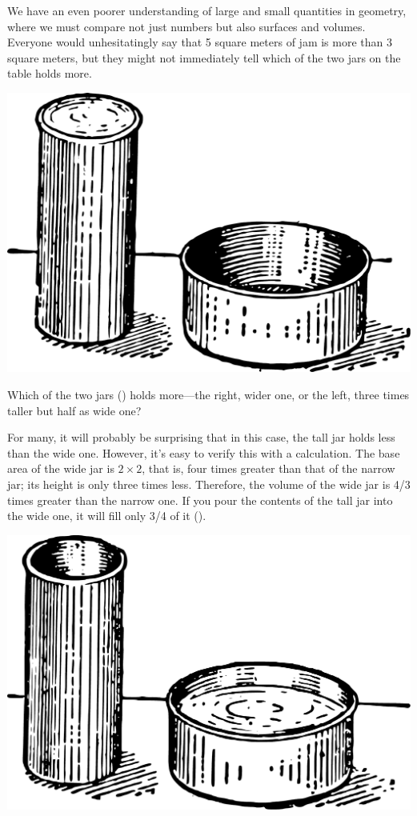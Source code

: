We have an even poorer understanding of large and small quantities in geometry, where we must compare not just numbers but also surfaces and volumes. Everyone would unhesitatingly say that 5 square meters of jam is more than 3 square meters, but they might not immediately tell which of the two jars on the table holds more.
\begin{marginfigure}[-2cm]%
\centering
\includegraphics[width=\textwidth]{figures/ch-11/fig-165.pdf}
\end{marginfigure}

\ques Which of the two jars () holds more—the right, wider one, or the left, three times taller but half as wide one?

\ans For many, it will probably be surprising that in this case, the tall jar holds less than the wide one. However, it’s easy to verify this with a calculation. The base area of the wide jar is $2 \times 2$, that is, four times greater than that of the narrow jar; its height is only three times less. Therefore, the volume of the wide jar is 4/3 times greater than the narrow one. If you pour the contents of the tall jar into the wide one, it will fill only 3/4 of it ().


\begin{marginfigure}[-2cm]%
\centering
\includegraphics[width=\textwidth]{figures/ch-11/fig-166.pdf}
\end{marginfigure}


